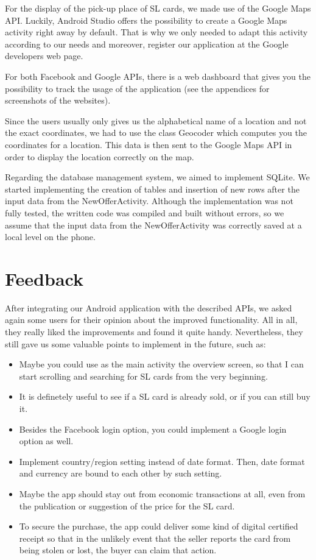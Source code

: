 \documentclass[11pt,twoside,a4paper]{report}
\begin{document}
For the display of the pick-up place of SL cards, we made use of the Google Maps API. Luckily, Android Studio offers the possibility to create a Google Maps activity right away by default. That is why we only needed to adapt this activity according to our needs and moreover, register our application at the Google developers web page. 

For both Facebook and Google APIs, there is a web dashboard that gives you the possibility to track the usage of the application (see the appendices for screenshots of the websites).

Since the users usually only gives us the alphabetical name of a location and not the exact coordinates, we had to use the class Geocoder which computes you the coordinates for a location. This data is then sent to the Google Maps API in order to display the location correctly on the map.

Regarding the database management system, we aimed to implement SQLite. We started implementing the creation of tables and insertion of new rows after the input data from the NewOfferActivity. Although the implementation was not fully tested, the written code was compiled and built without errors, so we assume that the input data from the NewOfferActivity was correctly saved at a local level on the phone.

\section{Feedback}

After integrating our Android application with the described APIs, we asked again some users for their opinion about the improved functionality. All in all, they really liked the improvements and found it quite handy. Nevertheless, they still gave us some valuable points to implement in the future, such as:

\begin{itemize}
\item Maybe you could use as the main activity the overview screen, so that I can start scrolling and searching for SL cards from the very beginning.
\item It is definetely useful to see if a SL card is already sold, or if you can still buy it.
\item Besides the Facebook login option, you could implement a Google login option as well.
\item Implement country/region setting instead of date format. Then, date format and currency are bound to each other by such setting.
\item Maybe the app should stay out from economic transactions at all, even from the publication or suggestion of the price for the SL card.
\item To secure the purchase, the app could deliver some kind of digital certified receipt so that in the unlikely event that the seller reports the card from being stolen or lost, the buyer can claim that action.
\end{itemize}
\end{document}
